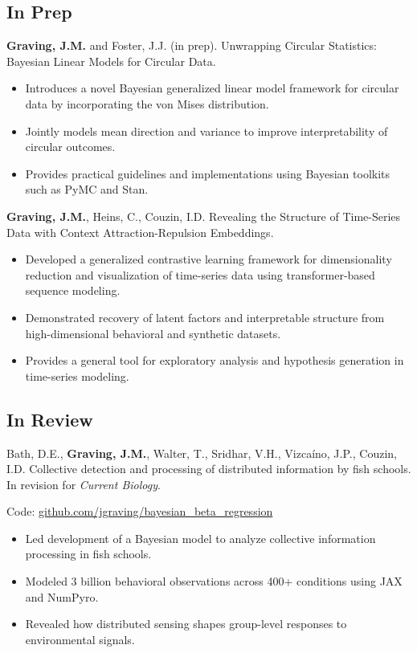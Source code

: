 \documentclass[10pt,a4paper]{article}
\begin{document}
\subsection*{In Prep}
\textbf{Graving, J.M.} and Foster, J.J. (in prep). Unwrapping Circular Statistics: Bayesian Linear Models for Circular Data.\par
\begin{itemize}
\item Introduces a novel Bayesian generalized linear model framework for circular data by incorporating the von Mises distribution.
\item Jointly models mean direction and variance to improve interpretability of circular outcomes.
\item Provides practical guidelines and implementations using Bayesian toolkits such as PyMC and Stan.
\end{itemize}
\textbf{Graving, J.M.}, Heins, C., Couzin, I.D. Revealing the Structure of Time-Series Data with Context Attraction-Repulsion Embeddings.\par
\begin{itemize}
\item Developed a generalized contrastive learning framework for dimensionality reduction and visualization of time-series data using transformer-based sequence modeling.
\item Demonstrated recovery of latent factors and interpretable structure from high-dimensional behavioral and synthetic datasets.
\item Provides a general tool for exploratory analysis and hypothesis generation in time-series modeling.
\end{itemize}
\subsection*{In Review}
Bath, D.E., \textbf{Graving, J.M.}, Walter, T., Sridhar, V.H., Vizcaíno, J.P., Couzin, I.D. Collective detection and processing of distributed information by fish schools. In revision for \textit{Current Biology}.\par
Code: \href{https://github.com/jgraving/bayesian_beta_regression}{github.com/jgraving/bayesian\_beta\_regression}\par
\begin{itemize}
\item Led development of a Bayesian model to analyze collective information processing in fish schools.
\item Modeled 3 billion behavioral observations across 400+ conditions using JAX and NumPyro.
\item Revealed how distributed sensing shapes group-level responses to environmental signals.
\end{itemize}
\end{document}
